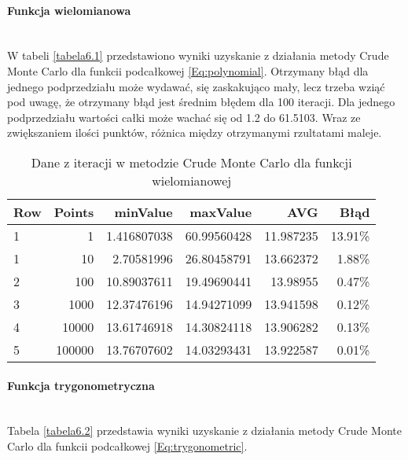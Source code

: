 \documentclass[12pt,twoside]{article}
\begin{document}
\paragraph{Funkcja wielomianowa}\mbox{} \\

W tabeli \eqref{tabela6.1} przedstawiono wyniki uzyskanie z działania metody Crude Monte Carlo dla funkcii podcałkowej \eqref{Eq:polynomial}.
Otrzymany błąd dla jednego podprzedziału może wydawać, się zaskakująco mały, lecz trzeba wziąć pod uwagę, że otrzymany błąd jest średnim błędem dla 100 iteracji. Dla jednego podprzedziału wartości całki może wachać się od 1.2 do 61.5103. Wraz ze zwiększaniem ilości punktów, różnica między otrzymanymi rzultatami maleje.


\begin{table}[H]
\centering 
\caption{Dane z iteracji w metodzie Crude Monte Carlo dla funkcji wielomianowej}
\label{tabela6.1}
\begin{tabular}{lrrrrr}
\toprule
{Row} &  Points &  minValue &  maxValue &       AVG &      Błąd \\
\midrule
1  &     1 & 1.416807038 &   60.99560428 & 11.987235 & 13.91\% \\
1  &     10 & 2.70581996 &   26.80458791 & 13.662372 & 1.88\% \\
2  &     100 & 10.89037611 &  19.49690441 & 13.98955& 0.47\% \\
3  &     1000 & 12.37476196 &   14.94271099 & 13.941598 & 0.12\% \\
4  &     10000 & 13.61746918 &  14.30824118 & 13.906282 & 0.13\% \\
5  &     100000 & 13.76707602 &  14.03293431 & 13.922587 & 0.01\% \\
\bottomrule
\end{tabular}
\end{table}


\paragraph{Funkcja trygonometryczna}\mbox{} \\

Tabela \eqref{tabela6.2} przedstawia wyniki uzyskanie z działania metody Crude Monte Carlo dla funkcii podcałkowej \eqref{Eq:trygonometric}.
\end{document}
